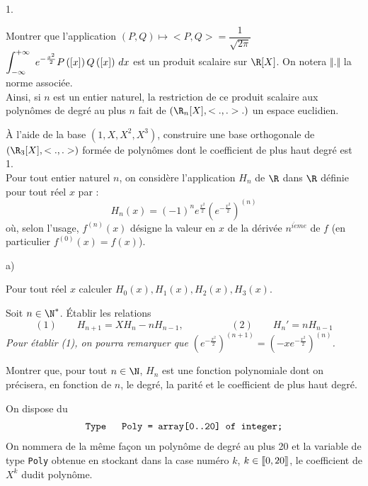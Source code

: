 \documentclass[11pt]{article}%
\begin{document}
\begin{noliste}{1.}
 \setlength{\itemsep}{4mm}
\item Montrer que l'application $(P,Q)\mapsto <P,Q> =
${$\dfrac{1}{\sqrt{2\pi }}$}$\displaystyle \int_{-\infty }^{+ \infty
}\ e^{-\frac{x^{2}}{2}}P\left(\left[ {x} \right]\right)Q\left(\left[ {x} \right]\right)\,dx$ est
un produit scalaire sur $\R[X]$. On notera $\Vert.\Vert $ la norme
associée.\\
Ainsi, si $n$ est un entier naturel, la restriction de ce produit
scalaire
aux polynômes de degré au plus $n$ fait de $(\R_{n}[X],<.,.>.)$ un
espace euclidien.

\item À l'aide de la base $(1,X,X^{2},X^{3})$, construire une base
orthogonale de $(\R_{3}[X],<.,.>)$ formée de polynômes dont le
coefficient de plus haut degré est 1.\\
Pour tout entier naturel $n$, on considère l'application $H_{n}$ de
$\R$ dans $\R$ définie pour tout réel $x$ par : 
\[
H_{n}(x) = (-1)^{n}e^{\frac{x^{2}}{2}}\left(
e^{-\frac{x^{2}}{2}}\right) ^{(n)}
\]
o{ù}, selon l'usage, $f^{(n)}(x)$ désigne la valeur en $x$ de la
dérivée $n^{i\grave{e}me}$ de $f$ (en particulier $f^{(0)}(x) = f(x)$).

\item 

\begin{noliste}{a)}
 \setlength{\itemsep}{2mm}
\item Pour tout réel $x$ calculer
$H_{0}(x),H_{1}(x),H_{2}(x),H_{3}(x)$.

\item Soit $n\in \N^{\ast }$. Établir les relations 
\[
(1)\qquad {}H_{n + 1} = XH_{n}-nH_{n-1},\hspace{2cm}(2)\qquad
{}H_{n}{\prime
} = nH_{n-1}
\]
\textit{Pour établir (1), on pourra remarquer que }$\left(
e^{-\frac{x^{2}}{2}}\right) ^{(n + 1)} = \left(
-xe^{-\frac{x^{2}}{2}}\right) ^{(n)}$\textit{.}

\item Montrer que, pour tout $n\in \N$, $H_{n}$ est une fonction
polynomiale dont on précisera, en fonction de $n$, le degré, la parité
et le
coefficient de plus haut degré.
\end{noliste}

\item On dispose du 
\[
\begin{tabular}{c}
\texttt{Type \ \ Poly = array[0..20] of integer;}\end{tabular}
\]
On nommera de la même façon un polynôme de degré au plus 20 et la
variable
de type \texttt{Poly} obtenue en stockant dans la case numéro $k$,
$k\in {[\hspace{-0.15em}[0,20]\hspace{-0.13em}]}$, le coefficient de
$X^{k}$ dudit
polynôme.


\end{noliste}
\end{document}

